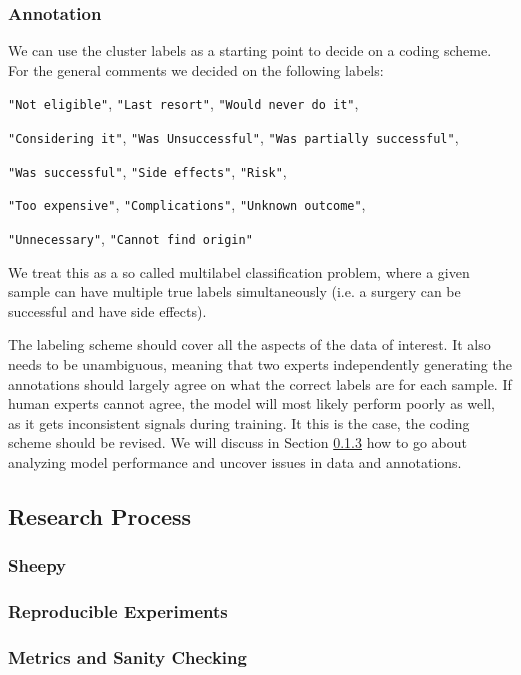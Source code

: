 \subsubsection{Annotation}
We can use the cluster labels as a starting point to decide on a coding scheme. For the general comments we decided on the following labels:
\begin{displayquote}
    \texttt{"Not eligible"},
    \texttt{"Last resort"},
    \texttt{"Would never do it"},

    \texttt{"Considering it"},
    \texttt{"Was Unsuccessful"},
    \texttt{"Was partially successful"},

    \texttt{"Was successful"},
    \texttt{"Side effects"},
    \texttt{"Risk"},

    \texttt{"Too expensive"},
    \texttt{"Complications"},
    \texttt{"Unknown outcome"},

    \texttt{"Unnecessary"},
    \texttt{"Cannot find origin"}
\end{displayquote}
We treat this as a so called multilabel classification problem, where a given sample can have multiple true labels simultaneously (i.e. a surgery can be successful and have side effects).

The labeling scheme should cover all the aspects of the data of interest.
It also needs to be unambiguous, meaning that two experts independently generating the annotations should largely agree on what the correct labels are for each sample.
If human experts cannot agree, the model will most likely perform poorly as well, as it gets inconsistent signals during training.
It this is the case, the coding scheme should be revised.
We will discuss in Section \ref{metrics_and_sanity_checking} how to go about analyzing model performance and uncover issues in data and annotations.

\subsection{Research Process}
\subsubsection{Sheepy}
\subsubsection{Reproducible Experiments}
\subsubsection{Metrics and Sanity Checking}
\label{metrics_and_sanity_checking}
